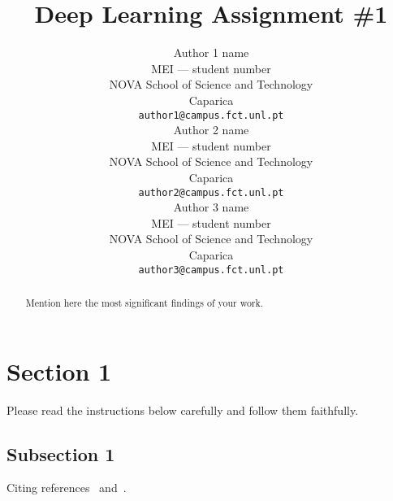 \documentclass{article}
\title{Deep Learning Assignment \#1}
\author{%
  Author 1 name \\
  MEI --- student number\\
  NOVA School of Science and Technology\\
  Caparica \\
  \texttt{author1@campus.fct.unl.pt} \\
  \And
   Author 2 name \\
   MEI --- student number\\
   NOVA School of Science and Technology\\
   Caparica \\
  \texttt{author2@campus.fct.unl.pt} \\
   \And
   Author 3 name \\
   MEI --- student number\\
   NOVA School of Science and Technology\\
   Caparica \\
  \texttt{author3@campus.fct.unl.pt} 
}
\begin{document}
\maketitle


\begin{abstract}
  Mention here the most significant findings of your work.
\end{abstract}


\section{Section 1}


Please read the instructions below carefully and follow them faithfully.


\subsection{Subsection 1}
Citing references~\cite{einstein} and~\cite{dirac}.


\printbibliography %
\end{document}
